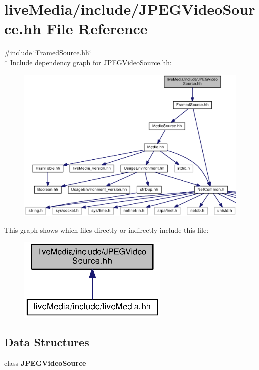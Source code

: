 \section{live\+Media/include/\+J\+P\+E\+G\+Video\+Source.hh File Reference}
\label{JPEGVideoSource_8hh}
{\ttfamily \#include \char`\"{}Framed\+Source.\+hh\char`\"{}}\\*
Include dependency graph for J\+P\+E\+G\+Video\+Source.\+hh\+:
\nopagebreak
\begin{figure}[H]
\begin{center}
\leavevmode
\includegraphics[width=350pt]{JPEGVideoSource_8hh__incl}
\end{center}
\end{figure}
This graph shows which files directly or indirectly include this file\+:
\nopagebreak
\begin{figure}[H]
\begin{center}
\leavevmode
\includegraphics[width=204pt]{JPEGVideoSource_8hh__dep__incl}
\end{center}
\end{figure}
\subsection*{Data Structures}
\begin{DoxyCompactItemize}
\item 
class {\bf J\+P\+E\+G\+Video\+Source}
\end{DoxyCompactItemize}
